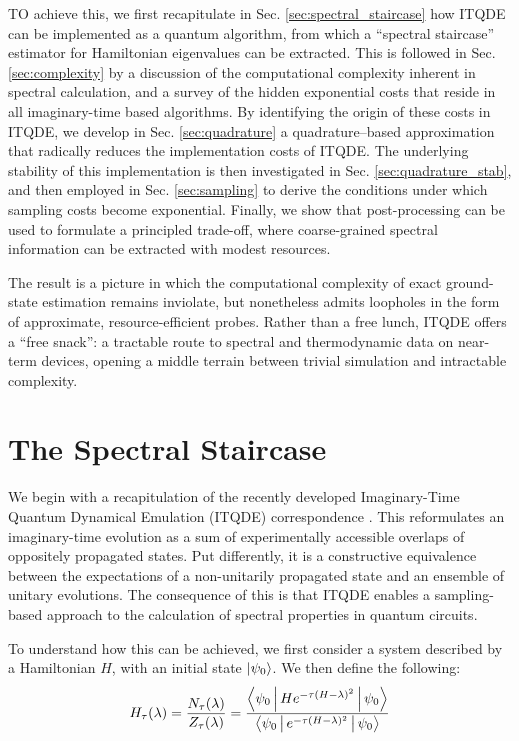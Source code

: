 \documentclass[reprint, aps,prx,showpacs,bibfootnote,preprintnumbers, mathtools, superscriptaddress, amsmath,amssymb]{revtex4-2}
\begin{document}
TO achieve this, we first recapitulate in Sec. \ref{sec:spectral_staircase} how ITQDE can be implemented as a quantum algorithm, from which a “spectral staircase” estimator for Hamiltonian eigenvalues can be extracted. This is followed in Sec. \ref{sec:complexity} by a discussion of the computational complexity inherent in spectral calculation, and a survey of the hidden exponential costs that reside in all imaginary-time based algorithms. By identifying the origin of these costs in ITQDE, we develop in Sec. \ref{sec:quadrature} a quadrature–based approximation that radically reduces the implementation costs of ITQDE. The underlying stability of this implementation is then investigated in Sec. \ref{sec:quadrature_stab}, and then employed in Sec. \ref{sec:sampling} to derive the conditions under which sampling costs become exponential. Finally, we show that post-processing can be used to formulate a principled trade-off, where coarse-grained spectral information can be extracted with modest resources.

The result is a picture in which the computational complexity of exact ground-state estimation remains inviolate, but nonetheless admits loopholes in the form of approximate, resource-efficient probes. Rather than a free lunch, ITQDE offers a “free snack”: a tractable route to spectral and thermodynamic data on near-term devices, opening a middle terrain between trivial simulation and intractable complexity.

\section{The Spectral Staircase \label{sec:spectral_staircase}}
We begin with a recapitulation of the recently developed Imaginary-Time Quantum Dynamical Emulation (ITQDE) correspondence \cite{leamer_quantum_2024}. This reformulates an imaginary-time evolution as a sum of experimentally accessible overlaps of oppositely propagated states. Put differently, it is a constructive equivalence between the expectations of a non-unitarily propagated state and an ensemble of unitary evolutions. The consequence of this is that ITQDE enables a sampling-based approach to the calculation of spectral properties in quantum circuits.

To understand how this can be achieved, we first consider a system described by a Hamiltonian $H$, with an initial state $\ket{\psi_0}$. We then define the following:
\begin{equation}
\label{eq:specstaircase}
   H_\tau(\lambda)   =\frac{N_\tau (\lambda)}{Z_\tau (\lambda)}= \frac{\Braket{\psi_0|H e^{-\tau(H - \lambda)^2}|\psi_0}}{\Braket{\psi_0|e^{-\tau(H - \lambda)^2}|\psi_0}}
\end{equation}
\end{document}
